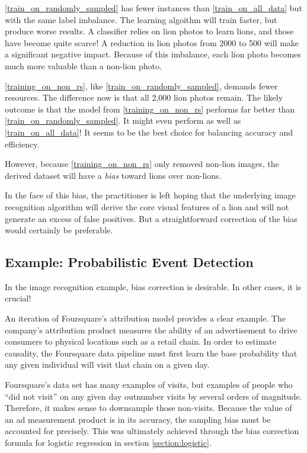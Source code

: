 \documentclass[twoside]{article}
\begin{document}
\ref{train_on_randomly_sampled} has fewer instances than \ref{train_on_all_data} but with the same label imbalance. The learning algoithm will train faster, but produce worse results. A classifier relies on lion photos to learn lions, and those have become quite scarce! A reduction in lion photos from 2000 to 500 will make a significant negative impact. Because of this imbalance, each lion photo becomes much more valuable than a non-lion photo. 

\ref{training_on_non_rs}, like \ref{train_on_randomly_sampled}, demands fewer resources. The difference now is that all 2,000 lion photos remain. The likely outcome is that the model from \ref{training_on_non_rs} performs far better than \ref{train_on_randomly_sampled}. It might even perform as well as \ref{train_on_all_data}! It seems to be the best choice for balancing accuracy and efficiency.

However, because \ref{training_on_non_rs} only removed non-lion images, the derived dataset will have a \textit{bias} toward lions over non-lions. 

In the face of this bias, the practitioner is left hoping that the underlying image recognition algorithm will derive the core visual features of a lion and will not generate an excess of false positives. But a straightforward correction of the bias would certainly be preferable.

\subsection{Example: Probabilistic Event Detection}
\label{section:visit}

In the image recognition example, bias correction is desirable. In other cases, it is crucial!

An iteration of Foursquare’s attribution model\cite{visitprediction} provides a clear example. The company's attribution product measures the ability of an advertisement to drive consumers to physical locations such as a retail chain. In order to estimate causality, the Foursquare data pipeline must first learn the base probability that any given individual will visit that chain on a given day.

Foursquare's data set has many examples of visits, but examples of people who “did not visit” on any given day outnumber visits by several orders of magnitude. Therefore, it makes sense to downsample those non-visits. Because the value of an ad measurement product is in its accuracy, the sampling bias must be accounted for precisely. This was ultimately achieved through the bias correction formula for logistic regression in section \ref{section:logistic}.
\end{document}
